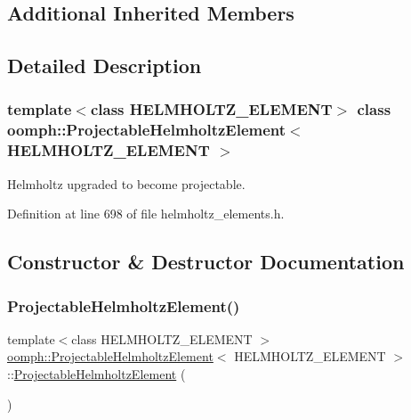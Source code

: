 \subsection*{Additional Inherited Members}


\subsection{Detailed Description}
\subsubsection*{template$<$class H\+E\+L\+M\+H\+O\+L\+T\+Z\+\_\+\+E\+L\+E\+M\+E\+NT$>$\newline
class oomph\+::\+Projectable\+Helmholtz\+Element$<$ H\+E\+L\+M\+H\+O\+L\+T\+Z\+\_\+\+E\+L\+E\+M\+E\+N\+T $>$}

Helmholtz upgraded to become projectable. 

Definition at line 698 of file helmholtz\+\_\+elements.\+h.



\subsection{Constructor \& Destructor Documentation}
\mbox{\label{classoomph_1_1ProjectableHelmholtzElement_a2432f702db869a4a50bec026b5fabc7b}} 
\subsubsection{\texorpdfstring{Projectable\+Helmholtz\+Element()}{ProjectableHelmholtzElement()}}
{\footnotesize\ttfamily template$<$class H\+E\+L\+M\+H\+O\+L\+T\+Z\+\_\+\+E\+L\+E\+M\+E\+NT $>$ \\
\hyperlink{classoomph_1_1ProjectableHelmholtzElement}{oomph\+::\+Projectable\+Helmholtz\+Element}$<$ H\+E\+L\+M\+H\+O\+L\+T\+Z\+\_\+\+E\+L\+E\+M\+E\+NT $>$\+::\hyperlink{classoomph_1_1ProjectableHelmholtzElement}{Projectable\+Helmholtz\+Element} (\begin{DoxyParamCaption}{ }\end{DoxyParamCaption})\hspace{0.3cm}{\ttfamily [inline]}}



